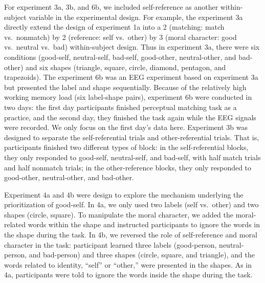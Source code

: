 \documentclass[
  english,
  man]{apa6}
\begin{document}
For experiment 3a, 3b, and 6b, we included self-reference as another within-subject variable in the experimental design. For example, the experiment 3a directly extend the design of experiment 1a into a 2 (matching: match vs.~nonmatch) by 2 (reference: self vs.~other) by 3 (moral character: good vs.~neutral vs.~bad) within-subject design. Thus in experiment 3a, there were six conditions (good-self, neutral-self, bad-self, good-other, neutral-other, and bad-other) and six shapes (triangle, square, circle, diamond, pentagon, and trapezoids). The experiment 6b was an EEG experiment based on experiment 3a but presented the label and shape sequentially. Because of the relatively high working memory load (six label-shape pairs), experiment 6b were conducted in two days: the first day participants finished perceptual matching task as a practice, and the second day, they finished the task again while the EEG signals were recorded. We only focus on the first day's data here. Experiment 3b was designed to separate the self-referential trials and other-referential trials. That is, participants finished two different types of block: in the self-referential blocks, they only responded to good-self, neutral-self, and bad-self, with half match trials and half nonmatch trials; in the other-reference blocks, they only responded to good-other, neutral-other, and bad-other.

Experiment 4a and 4b were design to explore the mechanism underlying the prioritization of good-self. In 4a, we only used two labels (self vs.~other) and two shapes (circle, square). To manipulate the moral character, we added the moral-related words within the shape and instructed participants to ignore the words in the shape during the task. In 4b, we reversed the role of self-reference and moral character in the task: participant learned three labels (good-person, neutral-person, and bad-person) and three shapes (circle, square, and triangle), and the words related to identity, ``self'' or ``other,'' were presented in the shapes. As in 4a, participants were told to ignore the words inside the shape during the task.
\end{document}
